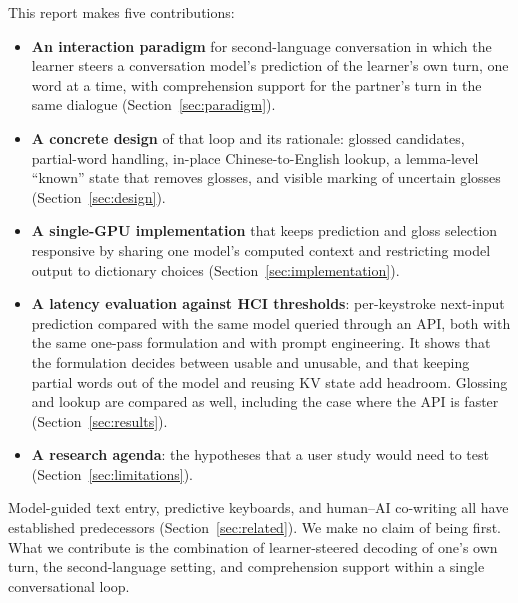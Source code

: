 \documentclass[11pt,a4paper]{article}
\begin{document}
This report makes five contributions:
\begin{itemize}\setlength{\itemsep}{1pt}
\item \textbf{An interaction paradigm} for second-language conversation in which the learner steers a conversation model's prediction of the learner's own turn, one word at a time, with comprehension support for the partner's turn in the same dialogue (Section~\ref{sec:paradigm}).
\item \textbf{A concrete design} of that loop and its rationale: glossed candidates, partial-word handling, in-place Chinese-to-English lookup, a lemma-level ``known'' state that removes glosses, and visible marking of uncertain glosses (Section~\ref{sec:design}).
\item \textbf{A single-GPU implementation} that keeps prediction and gloss selection responsive by sharing one model's computed context and restricting model output to dictionary choices (Section~\ref{sec:implementation}).
\item \textbf{A latency evaluation against HCI thresholds}: per-keystroke next-input prediction compared with the same model queried through an API, both with the same one-pass formulation and with prompt engineering. It shows that the formulation decides between usable and unusable, and that keeping partial words out of the model and reusing KV state add headroom. Glossing and lookup are compared as well, including the case where the API is faster (Section~\ref{sec:results}).
\item \textbf{A research agenda}: the hypotheses that a user study would need to test (Section~\ref{sec:limitations}).
\end{itemize}
Model-guided text entry, predictive keyboards, and human--AI co-writing all have established predecessors (Section~\ref{sec:related}). We make no claim of being first. What we contribute is the combination of learner-steered decoding of one's own turn, the second-language setting, and comprehension support within a single conversational loop.
\end{document}
